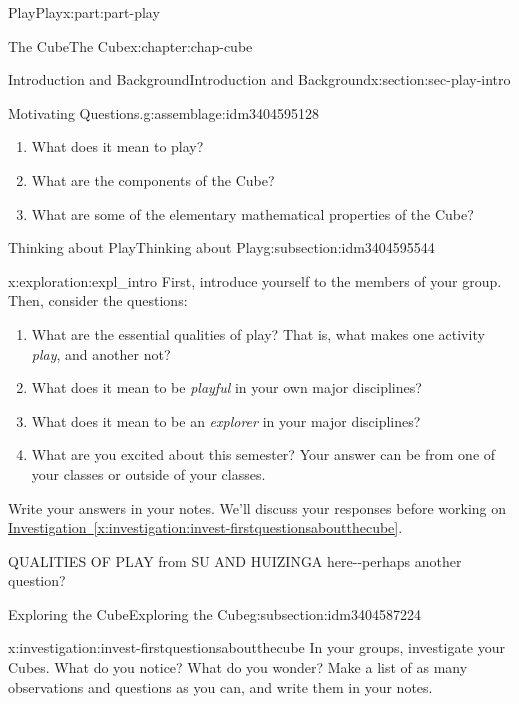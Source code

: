 \documentclass[oneside,10pt,]{book}
\newcommand{\xreffont}{\relax}
\numberwithin{equation}{section}
\begin{document}
\begin{partptx}{Play}{}{Play}{}{}{x:part:part-play}
\begin{chapterptx}{The Cube}{}{The Cube}{}{}{x:chapter:chap-cube}
\begin{sectionptx}{Introduction and Background}{}{Introduction and Background}{}{}{x:section:sec-play-intro}
\begin{introduction}{}
\begin{assemblage}{Motivating Questions.}{g:assemblage:idm3404595128}
\begin{enumerate}
\item{}What does it mean to play?%
\item{}What are the components of the Cube?%
\item{}What are some of the elementary mathematical properties of the Cube?%
\end{enumerate}
%
\end{assemblage}
\end{introduction}%
%
%
\typeout{************************************************}
\typeout{************************************************}
%
\begin{subsectionptx}{Thinking about Play}{}{Thinking about Play}{}{}{g:subsection:idm3404595544}
\begin{exploration}{}{x:exploration:expl_intro}%
First, introduce yourself to the members of your group. Then, consider the questions: %
\begin{enumerate}
\item{}What are the essential qualities of play? That is, what makes one activity \emph{play}, and another not?%
\item{}What does it mean to be \emph{playful} in your own major disciplines?%
\item{}What does it mean to be an \emph{explorer} in your major disciplines?%
\item{}What are you excited about this semester? Your answer can be from one of your classes or outside of your classes.%
\end{enumerate}
 Write your answers in your notes. We'll discuss your responses before working on \hyperref[x:investigation:invest-firstquestionsaboutthecube]{Investigation~{\xreffont\ref{x:investigation:invest-firstquestionsaboutthecube}}}.%
\end{exploration}%
 QUALITIES OF PLAY from SU AND HUIZINGA here-{}-{}perhaps another question?\end{subsectionptx}
%
%
\typeout{************************************************}
\typeout{************************************************}
%
\begin{subsectionptx}{Exploring the Cube}{}{Exploring the Cube}{}{}{g:subsection:idm3404587224}
\begin{investigation}{}{x:investigation:invest-firstquestionsaboutthecube}%
In your groups, investigate your Cubes. What do you notice? What do you wonder? Make a list of as many observations and questions as you can, and write them in your notes.%

\end{investigation}
\end{subsectionptx}
\end{sectionptx}
\end{chapterptx}
\end{partptx}
\end{document}
